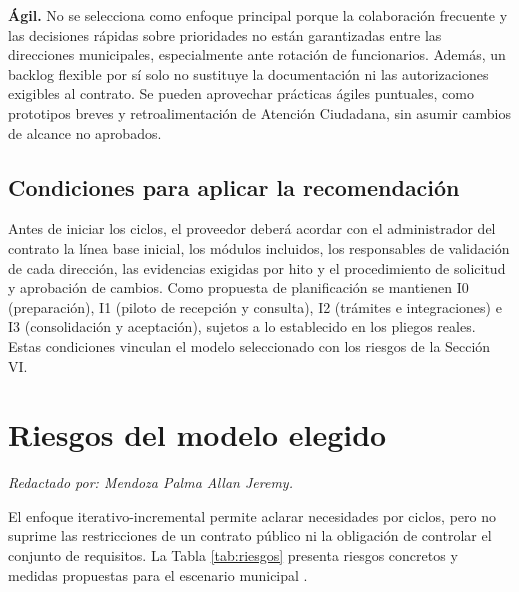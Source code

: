 \documentclass[conference,onecolumn]{IEEEtran}
\begin{document}
\noindent\textbf{Ágil.} No se selecciona como enfoque principal porque la colaboración frecuente y las decisiones rápidas sobre prioridades no están garantizadas entre las direcciones municipales, especialmente ante rotación de funcionarios. Además, un backlog flexible por sí solo no sustituye la documentación ni las autorizaciones exigibles al contrato. Se pueden aprovechar prácticas ágiles puntuales, como prototipos breves y retroalimentación de Atención Ciudadana, sin asumir cambios de alcance no aprobados.

\subsection{Condiciones para aplicar la recomendación}

Antes de iniciar los ciclos, el proveedor deberá acordar con el administrador del contrato la línea base inicial, los módulos incluidos, los responsables de validación de cada dirección, las evidencias exigidas por hito y el procedimiento de solicitud y aprobación de cambios. Como propuesta de planificación se mantienen I0 (preparación), I1 (piloto de recepción y consulta), I2 (trámites e integraciones) e I3 (consolidación y aceptación), sujetos a lo establecido en los pliegos reales. Estas condiciones vinculan el modelo seleccionado con los riesgos de la Sección VI.

\section{Riesgos del modelo elegido}
\noindent\textit{Redactado por: Mendoza Palma Allan Jeremy.}\par\smallskip

El enfoque iterativo-incremental permite aclarar necesidades por ciclos, pero no suprime las restricciones de un contrato público ni la obligación de controlar el conjunto de requisitos. La Tabla \ref{tab:riesgos} presenta riesgos concretos y medidas propuestas para el escenario municipal \cite{pohl2025,buhne2026}.
\end{document}
